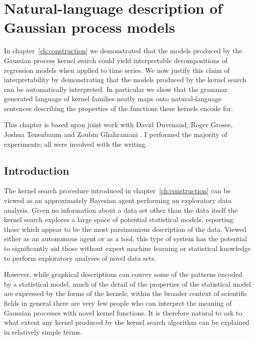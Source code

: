 
\inbpdocument

\chapter{Natural-language description of Gaussian process models}
\label{ch:description}

In chapter~\ref{ch:construction} we demonstrated that the models produced by the Gaussian process kernel search could yield interpretable decompositions of regression models when applied to time series.
We now justify this claim of interpretability by demonstrating that the models produced by the kernel search can be automatically interpreted.
In particular we show that the grammar generated language of kernel families neatly maps onto natural-language sentences describing the properties of the functions these kernels encode for.

This chapter is based upon joint work with David Duvenaud, Roger Grosse, Joshua Tenenbaum and Zoubin Ghahramani \citep{Lloyd2014-nz}.
I performed the majority of experiments; all were involved with the writing.

\section{Introduction}

The kernel search procedure introduced in chapter~\ref{ch:construction} can be viewed as an approximately Bayesian agent performing an exploratory data analysis.
Given no information about a data set other than the data itself the kernel search explores a large space of potential statistical models, reporting those which appear to be the most parsimonious description of the data.
Viewed either as an autonomous agent or as a tool, this type of system has the potential to significantly aid those without expert machine learning or statistical knowledge to perform exploratory analyses of novel data sets.

However, while graphical descriptions can convey some of the patterns encoded by a statistical model, much of the detail of the properties of the statistical model are expressed by the forms of the kernels; within the broader context of scientific fields in general there are very few people who can interpret the meaning of Gaussian processes with novel kernel functions.
It is therefore natural to ask to what extent any kernel produced by the kernel search algorithm can be explained in relatively simple terms.


